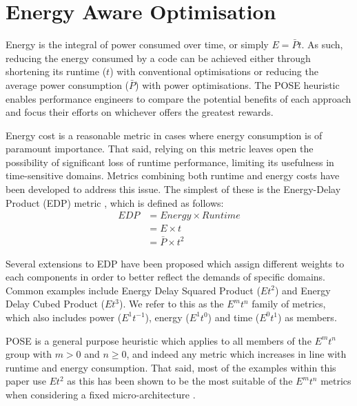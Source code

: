 \section{Energy Aware Optimisation}
\label{sec:optimisation}

Energy is the integral of power consumed over time, or simply $E = \bar{P}t$.
As such, reducing the energy consumed by a code can be achieved either through shortening its runtime ($t$) with conventional optimisations or reducing the average power consumption ($\bar{P}$) with power optimisations.
The POSE heuristic enables performance engineers to compare the potential benefits of each approach and focus their efforts on whichever offers the greatest rewards.

Energy cost is a reasonable metric in cases where energy consumption is of paramount importance.
That said, relying on this metric leaves open the possibility of significant loss of runtime performance, limiting its usefulness in time-sensitive domains.
Metrics combining both runtime and energy costs have been developed to address this issue. 
The simplest of these is the Energy-Delay Product (EDP) metric \cite{gonzales:1995aa}, which is defined as follows:
\begin{align}
  EDP &= Energy \times Runtime \nonumber \\
      &= E \times t \nonumber \\
      &= \bar{P} \times t^2
  \label{eq:edp}
\end{align}

Several extensions to EDP have been proposed which assign different weights to each components in order to better reflect the demands of specific domains.
Common examples include Energy Delay Squared Product ($Et^{2}$) and Energy Delay Cubed Product ($Et^{3}$).
We refer to this as the $E^mt^n$ family of metrics, which also includes power ($E^1t^{-1}$), energy ($E^1t^0$) and time ($E^0t^1$) as members.

POSE is a general purpose heuristic which applies to all members of the $E^mt^n$ group with $m > 0$ and $n \geq 0$, and indeed any metric which increases in line with runtime and energy consumption.
That said, most of the examples within this paper use $Et^2$ as this has been shown to be the most suitable of the $E^mt^n$ metrics when considering a fixed micro-architecture \cite{brooks:2000aa}.

